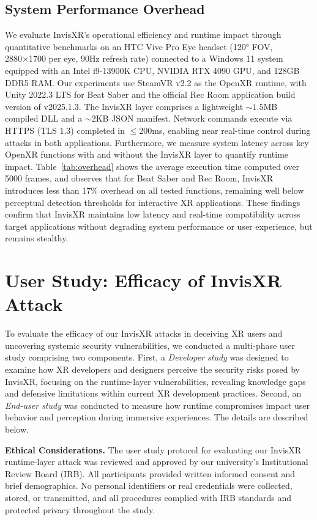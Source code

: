 \documentclass[letterpaper,twocolumn,10pt]{article}
\begin{document}
\subsection{System Performance Overhead}
We evaluate InvisXR’s operational efficiency and runtime impact through quantitative benchmarks on an HTC Vive Pro Eye headset (120° FOV, 2880×1700 per eye, 90Hz refresh rate) connected to a Windows 11 system equipped with an Intel i9-13900K CPU, NVIDIA RTX 4090 GPU, and 128GB DDR5 RAM. Our experiments use SteamVR v2.2 as the OpenXR runtime, with Unity 2022.3 LTS for Beat Saber and the official Rec Room application build version of v2025.1.3. The InvisXR layer comprises a lightweight $\sim1.5$MB compiled DLL and a $\sim2$KB JSON manifest. Network commands execute via HTTPS (TLS 1.3) completed in $\leq$200ms, enabling near real-time control during attacks in both applications. Furthermore, we measure system latency across key OpenXR functions with and without the InvisXR layer to quantify runtime impact. Table~\ref{tab:overhead} shows the average execution time computed over 5000 frames, and observes that for Beat Saber and Rec Room, InvisXR introduces less than 17\% overhead on all tested functions, remaining well below perceptual detection thresholds for interactive XR applications. These findings confirm that InvisXR maintains low latency and real-time compatibility across target applications without degrading system performance or user experience, but remains stealthy.

\section{User Study: Efficacy of InvisXR Attack}
To evaluate the efficacy of our InvisXR attacks in deceiving XR users and uncovering systemic security vulnerabilities, we conducted a multi-phase user study comprising two components. First, a \textit{Developer study} was designed to examine how XR developers and designers perceive the security risks posed by InvisXR, focusing on the runtime-layer vulnerabilities, revealing knowledge gaps and defensive limitations within current XR development practices. Second, an \textit{End-user study} was conducted to measure how runtime compromises impact user behavior and perception during immersive experiences. The details are described below. 

\textbf{Ethical Considerations.} The user study protocol for evaluating our InvisXR runtime-layer attack was reviewed and approved by our university’s Institutional Review Board (IRB). All participants provided written informed consent and brief demographics. No personal identifiers or real credentials were collected, stored, or transmitted, and all procedures complied with IRB standards and protected privacy throughout the study.
\end{document}
